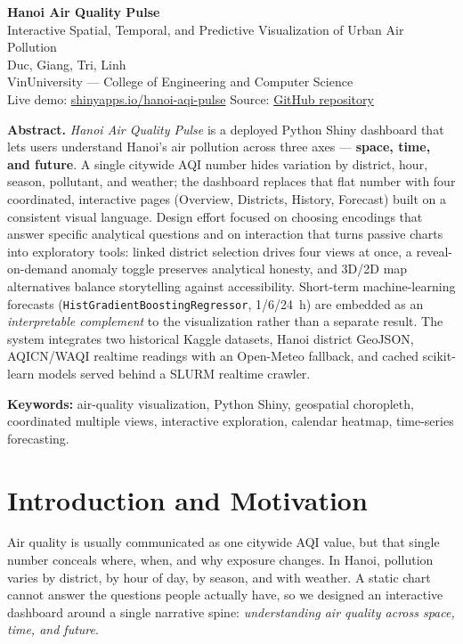 \documentclass[a4paper]{article}
\begin{document}
\begin{center}
    {\LARGE \textbf{\color{DarkRed} Hanoi Air Quality Pulse}}\\[2pt]
    {\large Interactive Spatial, Temporal, and Predictive Visualization of Urban Air Pollution}\\[8pt]
    {\normalsize Duc, Giang, Tri, Linh}\\[2pt]
    {\small VinUniversity --- College of Engineering and Computer Science}\\[4pt]
    {\small Live demo: \href{https://giangnguyenson.shinyapps.io/hanoi-aqi-pulse/}{shinyapps.io/hanoi-aqi-pulse}
    \quad\textbar\quad %
    Source: \href{https://github.com/}{GitHub repository}}
\end{center}

\noindent\textbf{Abstract.}
\textit{Hanoi Air Quality Pulse} is a deployed Python Shiny dashboard that lets users understand Hanoi's
air pollution across three axes --- \textbf{space, time, and future}. A single citywide AQI number hides
variation by district, hour, season, pollutant, and weather; the dashboard replaces that flat number with
four coordinated, interactive pages (Overview, Districts, History, Forecast) built on a consistent
visual language. Design effort focused on choosing encodings that answer specific analytical questions
and on interaction that turns passive charts into exploratory tools: linked district selection drives
four views at once, a reveal-on-demand anomaly toggle preserves analytical honesty, and 3D/2D map
alternatives balance storytelling against accessibility. Short-term machine-learning forecasts
(\texttt{HistGradientBoostingRegressor}, 1/6/24~h) are embedded as an \emph{interpretable complement} to
the visualization rather than a separate result. The system integrates two historical Kaggle datasets,
Hanoi district GeoJSON, AQICN/WAQI realtime readings with an Open-Meteo fallback, and cached scikit-learn
models served behind a SLURM realtime crawler.

\smallskip
\noindent\textbf{Keywords:} air-quality visualization, Python Shiny, geospatial choropleth, coordinated
multiple views, interactive exploration, calendar heatmap, time-series forecasting.

\section{Introduction and Motivation}
Air quality is usually communicated as one citywide AQI value, but that single number conceals where,
when, and why exposure changes. In Hanoi, pollution varies by district, by hour of day, by season, and
with weather. A static chart cannot answer the questions people actually have, so we designed an
interactive dashboard around a single narrative spine: \emph{understanding air quality across space, time,
and future}.
\end{document}
